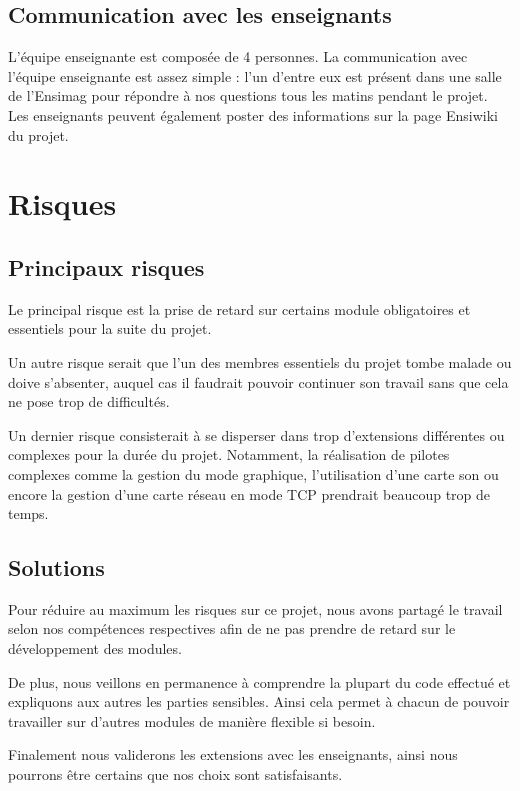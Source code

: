 \documentclass[a4paper, 11pt, titlepage]{article}
\begin{document}
\subsection{Communication avec les enseignants}

L'équipe enseignante est composée de 4 personnes. La communication avec l'équipe enseignante est assez simple : l'un d'entre eux est présent dans une salle de l'Ensimag pour répondre à nos questions tous les matins pendant le projet. Les enseignants peuvent également poster des informations sur la page Ensiwiki du projet.


\section{Risques}

\subsection{Principaux risques}

Le principal risque est la prise de retard sur certains module obligatoires et essentiels pour la suite du projet.

Un autre risque serait que l'un des membres essentiels du projet tombe malade ou doive s'absenter, auquel cas il faudrait pouvoir continuer son travail sans que cela ne pose trop de difficultés.

Un dernier risque consisterait à se disperser dans trop d'extensions différentes ou complexes pour la durée du projet. Notamment, la réalisation de pilotes complexes comme la gestion du mode graphique, l'utilisation d'une carte son ou encore la gestion d'une carte réseau en mode TCP prendrait beaucoup trop de temps.


\subsection{Solutions}

Pour réduire au maximum les risques sur ce projet, nous avons partagé le travail selon nos compétences respectives afin de ne pas prendre de retard sur le développement des modules.

De plus, nous veillons en permanence à comprendre la plupart du code effectué et expliquons aux autres les parties sensibles. Ainsi cela permet à chacun de pouvoir travailler sur d'autres modules de manière flexible si besoin.

Finalement nous validerons les extensions avec les enseignants, ainsi nous pourrons être certains que nos choix sont satisfaisants.
\end{document}
